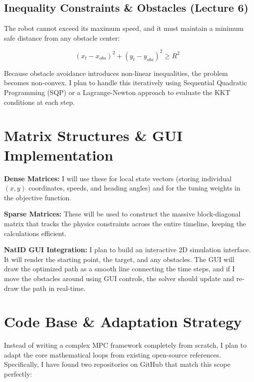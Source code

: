 \documentclass[12pt]{article}
\begin{document}
\subsection*{Inequality Constraints \& Obstacles (Lecture 6)}

The robot cannot exceed its maximum speed, and it must maintain a minimum safe distance from any obstacle center:

\begin{equation}
    (x_t - x_{obs})^2 + (y_t - y_{obs})^2 \geq R^2
\end{equation}

Because obstacle avoidance introduces non-linear inequalities, the problem becomes non-convex. I plan to handle this iteratively using Sequential Quadratic Programming (SQP) or a Lagrange-Newton approach to evaluate the KKT conditions at each step.

\section*{Matrix Structures \& GUI Implementation}

\textbf{Dense Matrices:} I will use these for local state vectors (storing individual $(x, y)$ coordinates, speeds, and heading angles) and for the tuning weights in the objective function.

\textbf{Sparse Matrices:} These will be used to construct the massive block-diagonal matrix that tracks the physics constraints across the entire timeline, keeping the calculations efficient.

\textbf{NatID GUI Integration:} I plan to build an interactive 2D simulation interface. It will render the starting point, the target, and any obstacles. The GUI will draw the optimized path as a smooth line connecting the time steps, and if I move the obstacles around using GUI controls, the solver should update and re-draw the path in real-time.

\section*{Code Base \& Adaptation Strategy}

Instead of writing a complex MPC framework completely from scratch, I plan to adapt the core mathematical loops from existing open-source references. Specifically, I have found two repositories on GitHub that match this scope perfectly:
\end{document}
